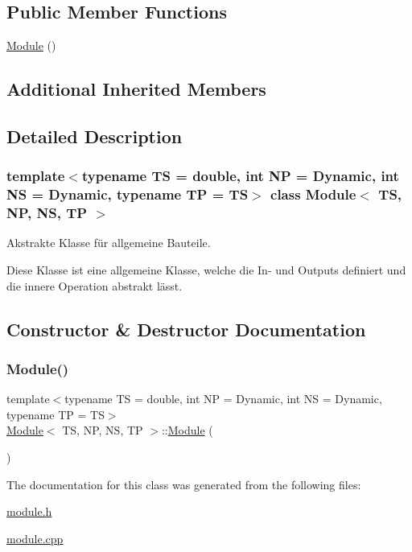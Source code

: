 \subsection*{Public Member Functions}
\begin{DoxyCompactItemize}
\item 
\mbox{\hyperlink{class_module_a40ec09f0f85314f2b542077d83567d7a}{Module}} ()
\end{DoxyCompactItemize}
\subsection*{Additional Inherited Members}


\subsection{Detailed Description}
\subsubsection*{template$<$typename TS = double, int NP = Dynamic, int NS = Dynamic, typename TP = TS$>$\newline
class Module$<$ T\+S, N\+P, N\+S, T\+P $>$}

Akstrakte Klasse für allgemeine Bauteile. 

Diese Klasse ist eine allgemeine Klasse, welche die In-\/ und Outputs definiert und die innere Operation abstrakt lässt. 

\subsection{Constructor \& Destructor Documentation}
\mbox{\label{class_module_a40ec09f0f85314f2b542077d83567d7a}} 
\subsubsection{\texorpdfstring{Module()}{Module()}}
{\footnotesize\ttfamily template$<$typename TS = double, int NP = Dynamic, int NS = Dynamic, typename TP = TS$>$ \\
\mbox{\hyperlink{class_module}{Module}}$<$ TS, NP, NS, TP $>$\+::\mbox{\hyperlink{class_module}{Module}} (\begin{DoxyParamCaption}{ }\end{DoxyParamCaption})}



The documentation for this class was generated from the following files\+:\begin{DoxyCompactItemize}
\item 
\mbox{\hyperlink{module_8h}{module.\+h}}\item 
\mbox{\hyperlink{module_8cpp}{module.\+cpp}}\end{DoxyCompactItemize}
